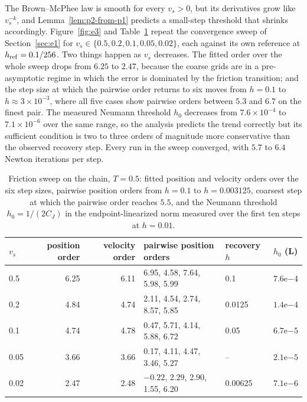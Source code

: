 \documentclass[preprint,12pt]{elsarticle}
\begin{document}
The Brown--McPhee law is smooth for every $v_s>0$, but its derivatives grow like $v_s^{-k}$, and
Lemma~\ref{lem:p2-from-p1} predicts a small-step threshold that shrinks accordingly.
Figure~\ref{fig:e3} and Table~\ref{tab:e3} repeat the convergence sweep of Section~\ref{sec:e1}
for $v_s\in\{0.5,0.2,0.1,0.05,0.02\}$, each against its own reference at $h_{\rm ref}=0.1/256$.
Two things happen as $v_s$ decreases. The fitted order over the whole sweep drops from $6.25$ to
$2.47$, because the coarse grids are in a pre-asymptotic regime in which the error is dominated by
the friction transition; and the step size at which the pairwise order returns to six moves from
$h=0.1$ to $h\approx3\times10^{-3}$, where all five cases show pairwise orders between $5.3$ and
$6.7$ on the finest pair. The measured Neumann threshold $h_0$ decreases from $7.6\times10^{-4}$ to
$7.1\times10^{-6}$ over the same range, so the analysis predicts the trend correctly but its
sufficient condition is two to three orders of magnitude more conservative than the observed
recovery step. Every run in the sweep converged, with $5.7$ to $6.4$ Newton iterations per step.

\begin{table}[!htb]
\centering
\caption{Friction sweep on the chain, $T=0.5$: fitted position and velocity orders over the six
step sizes, pairwise position orders from $h=0.1$ to $h=0.003125$, coarsest step at which the
pairwise order reaches $5.5$, and the Neumann threshold $h_0=1/(2C_J)$ in the endpoint-linearized
norm measured over the first ten steps at $h=0.01$.}
\label{tab:e3}
\scriptsize
\setlength{\tabcolsep}{3.5pt}
\begin{tabular}{@{}lrrlll@{}}
\toprule
$v_s$ & position order & velocity order & pairwise position orders & recovery $h$ & $h_0$ (L) \\
\midrule
0.5  & 6.25 & 6.11 & 6.95, 4.58, 7.64, 5.98, 5.99 & 0.1     & $7.6\mathrm{e}{-4}$ \\
0.2  & 4.84 & 4.74 & 2.11, 4.54, 2.74, 8.57, 5.85 & 0.0125  & $1.4\mathrm{e}{-4}$ \\
0.1  & 4.74 & 4.78 & 0.47, 5.71, 4.14, 5.88, 6.72 & 0.05    & $6.7\mathrm{e}{-5}$ \\
0.05 & 3.66 & 3.66 & 0.17, 4.11, 4.47, 3.46, 5.27 & --      & $2.1\mathrm{e}{-5}$ \\
0.02 & 2.47 & 2.48 & $-0.22$, 2.29, 2.90, 1.55, 6.20 & 0.00625 & $7.1\mathrm{e}{-6}$ \\
\bottomrule
\end{tabular}
\end{table}
\end{document}
